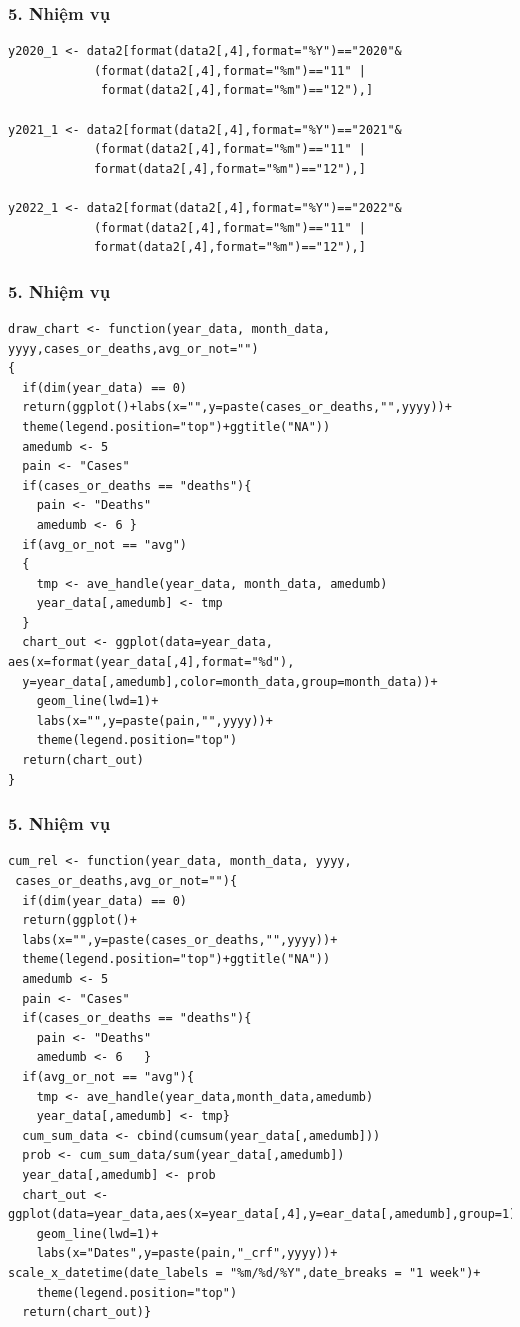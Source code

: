 \documentclass[english,10pt,table]{beamer}
\begin{document}
\begin{frame}[fragile]
\frametitle{5.  Nhiệm vụ}
\lstset{
    title=Function and data for v vi vii viii}
\begin{lstlisting}[frame = single,basicstyle=\tiny]
y2020_1 <- data2[format(data2[,4],format="%Y")=="2020"& 
            (format(data2[,4],format="%m")=="11" | 
             format(data2[,4],format="%m")=="12"),]

y2021_1 <- data2[format(data2[,4],format="%Y")=="2021"& 
            (format(data2[,4],format="%m")=="11" | 
            format(data2[,4],format="%m")=="12"),]

y2022_1 <- data2[format(data2[,4],format="%Y")=="2022"& 
            (format(data2[,4],format="%m")=="11" | 
            format(data2[,4],format="%m")=="12"),]
\end{lstlisting}
\end{frame}

\begin{frame}[fragile]
\frametitle{5.  Nhiệm vụ}
\lstset{
    title=Function and data for v vi vii viii}
\begin{lstlisting}[frame = single,basicstyle=\tiny]
draw_chart <- function(year_data, month_data, yyyy,cases_or_deaths,avg_or_not="")
{
  if(dim(year_data) == 0)
  return(ggplot()+labs(x="",y=paste(cases_or_deaths,"",yyyy))+
  theme(legend.position="top")+ggtitle("NA"))
  amedumb <- 5
  pain <- "Cases"
  if(cases_or_deaths == "deaths"){
    pain <- "Deaths"
    amedumb <- 6 }
  if(avg_or_not == "avg")
  {
    tmp <- ave_handle(year_data, month_data, amedumb)
    year_data[,amedumb] <- tmp
  }
  chart_out <- ggplot(data=year_data, aes(x=format(year_data[,4],format="%d"),
  y=year_data[,amedumb],color=month_data,group=month_data))+
    geom_line(lwd=1)+
    labs(x="",y=paste(pain,"",yyyy))+
    theme(legend.position="top")
  return(chart_out)
}

\end{lstlisting}
\end{frame}

\begin{frame}[fragile]
\frametitle{5.  Nhiệm vụ}
\lstset{
    title=Function and data for v vi vii viii}
\begin{lstlisting}[frame = single,basicstyle=\tiny]
cum_rel <- function(year_data, month_data, yyyy, 
 cases_or_deaths,avg_or_not=""){
  if(dim(year_data) == 0)
  return(ggplot()+
  labs(x="",y=paste(cases_or_deaths,"",yyyy))+
  theme(legend.position="top")+ggtitle("NA"))
  amedumb <- 5
  pain <- "Cases"
  if(cases_or_deaths == "deaths"){
    pain <- "Deaths"
    amedumb <- 6   }
  if(avg_or_not == "avg"){
    tmp <- ave_handle(year_data,month_data,amedumb)
    year_data[,amedumb] <- tmp}
  cum_sum_data <- cbind(cumsum(year_data[,amedumb]))
  prob <- cum_sum_data/sum(year_data[,amedumb])
  year_data[,amedumb] <- prob      
  chart_out <- ggplot(data=year_data,aes(x=year_data[,4],y=ear_data[,amedumb],group=1))+
    geom_line(lwd=1)+
    labs(x="Dates",y=paste(pain,"_crf",yyyy))+
scale_x_datetime(date_labels = "%m/%d/%Y",date_breaks = "1 week")+
    theme(legend.position="top")
  return(chart_out)}
\end{lstlisting}
\end{frame}
\end{document}
